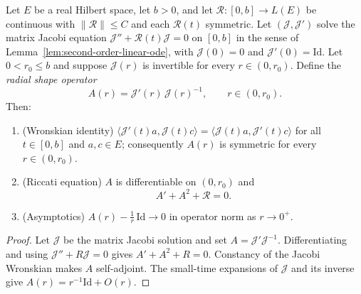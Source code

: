 \begin{lemma}
\label{lem:radial-shape-riccati}
\leanok



Let $E$ be a real Hilbert space, let $b>0$, and let
$\mathcal R\colon[0,b]\to L(E)$ be continuous with
$\|\mathcal R\|\le C$ and each $\mathcal R(t)$ symmetric. Let
$({\mathcal J},{\mathcal J}')$ solve the matrix Jacobi equation
${\mathcal J}''+{\mathcal R}(t){\mathcal J}=0$ on $[0,b]$ in the sense
of Lemma~\ref{lem:second-order-linear-ode}, with ${\mathcal J}(0)=0$
and ${\mathcal J}'(0)=\mathrm{Id}$. Let $0<r_0\le b$ and suppose
${\mathcal J}(r)$ is invertible for every $r\in(0,r_0)$. Define the
\emph{radial shape operator}
$$A(r)={\mathcal J}'(r)\,{\mathcal J}(r)^{-1},\qquad r\in(0,r_0).$$
Then:
\begin{enumerate}
\item (Wronskian identity) $\langle{\mathcal J}'(t)a,{\mathcal
J}(t)c\rangle=\langle{\mathcal J}(t)a,{\mathcal J}'(t)c\rangle$ for all
$t\in[0,b]$ and $a,c\in E$; consequently $A(r)$ is symmetric for every
$r\in(0,r_0)$.
\item (Riccati equation) $A$ is differentiable on $(0,r_0)$ and
$$A'+A^2+{\mathcal R}=0 .$$
\item (Asymptotics) $A(r)-\tfrac1r\,\mathrm{Id}\to0$ in operator norm
as $r\to0^+$.
\end{enumerate}
\end{lemma}

\begin{proof}
\sketch
{}
\leanok
Let $\mathcal J$ be the matrix Jacobi solution and set $A=\mathcal J'\mathcal J^{-1}$. Differentiating and using $\mathcal J''+R\mathcal J=0$ gives $A'+A^2+R=0$. Constancy of the Jacobi Wronskian makes $A$ self-adjoint. The small-time expansions of $\mathcal J$ and its inverse give $A(r)=r^{-1}\mathrm{Id}+O(r)$.
\end{proof}

